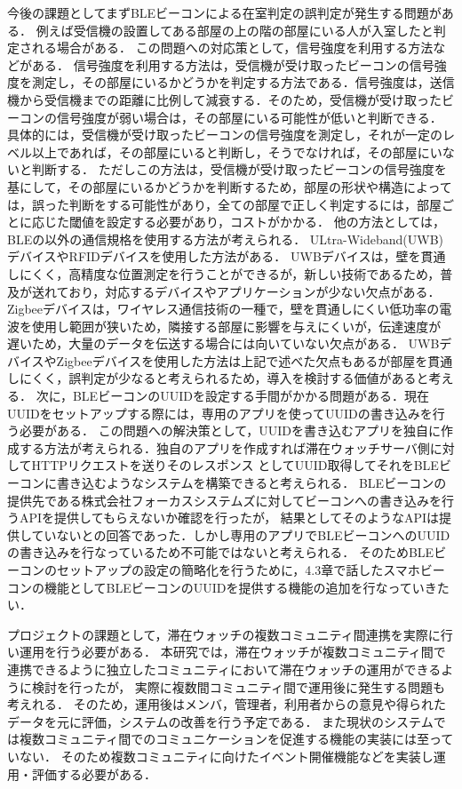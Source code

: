 今後の課題としてまずBLEビーコンによる在室判定の誤判定が発生する問題がある．
例えば受信機の設置してある部屋の上の階の部屋にいる人が入室したと判定される場合がある．
この問題への対応策として，信号強度を利用する方法などがある．
信号強度を利用する方法は，受信機が受け取ったビーコンの信号強度を測定し，その部屋にいるかどうかを判定する方法である．信号強度は，送信機から受信機までの距離に比例して減衰する．そのため，受信機が受け取ったビーコンの信号強度が弱い場合は，その部屋にいる可能性が低いと判断できる．
具体的には，受信機が受け取ったビーコンの信号強度を測定し，それが一定のレベル以上であれば，その部屋にいると判断し，そうでなければ，その部屋にいないと判断する．
ただしこの方法は，受信機が受け取ったビーコンの信号強度を基にして，その部屋にいるかどうかを判断するため，部屋の形状や構造によっては，誤った判断をする可能性があり，全ての部屋で正しく判定するには，部屋ごとに応じた閾値を設定する必要があり，コストがかかる．
他の方法としては，BLEの以外の通信規格を使用する方法が考えられる．
ULtra-Wideband(UWB)デバイスやRFIDデバイスを使用した方法がある．
UWBデバイスは，壁を貫通しにくく，高精度な位置測定を行うことができるが，新しい技術であるため，普及が送れており，対応するデバイスやアプリケーションが少ない欠点がある．
Zigbeeデバイスは，ワイヤレス通信技術の一種で，壁を貫通しにくい低功率の電波を使用し範囲が狭いため，隣接する部屋に影響を与えにくいが，伝達速度が
遅いため，大量のデータを伝送する場合には向いていない欠点がある．
UWBデバイスやZigbeeデバイスを使用した方法は上記で述べた欠点もあるが部屋を貫通しにくく，誤判定が少なると考えられるため，導入を検討する価値があると考える．
次に，BLEビーコンのUUIDを設定する手間がかかる問題がある．現在UUIDをセットアップする際には，専用のアプリを使ってUUIDの書き込みを行う必要がある．
この問題への解決策として，UUIDを書き込むアプリを独自に作成する方法が考えられる．独自のアプリを作成すれば滞在ウォッチサーバ側に対してHTTPリクエストを送りそのレスポンス
としてUUID取得してそれをBLEビーコンに書き込むようなシステムを構築できると考えられる．
BLEビーコンの提供先である株式会社フォーカスシステムズに対してビーコンへの書き込みを行うAPIを提供してもらえないか確認を行ったが，
結果としてそのようなAPIは提供していないとの回答であった．しかし専用のアプリでBLEビーコンへのUUIDの書き込みを行なっているため不可能ではないと考えられる．
そのためBLEビーコンのセットアップの設定の簡略化を行うために，4.3章で話したスマホビーコンの機能としてBLEビーコンのUUIDを提供する機能の追加を行なっていきたい．

プロジェクトの課題として，滞在ウォッチの複数コミュニティ間連携を実際に行い運用を行う必要がある．
本研究では，滞在ウォッチが複数コミュニティ間で連携できるように独立したコミュニティにおいて滞在ウォッチの運用ができるように検討を行ったが，
実際に複数間コミュニティ間で運用後に発生する問題も考えれる．
そのため，運用後はメンバ，管理者，利用者からの意見や得られたデータを元に評価，システムの改善を行う予定である．
また現状のシステムでは複数コミュニティ間でのコミュニケーションを促進する機能の実装には至っていない．
そのため複数コミュニティに向けたイベント開催機能などを実装し運用・評価する必要がある．



